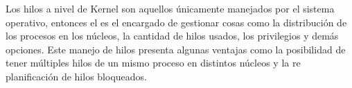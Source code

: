 \documentclass[12pt]{article}
\begin{document}
Los hilos a nivel de Kernel son aquellos únicamente manejados por el sistema operativo, entonces el es el encargado de gestionar cosas como la distribución de los procesos en los núcleos,  la cantidad de hilos usados, los privilegios y demás opciones. Este manejo de hilos presenta algunas ventajas como la posibilidad de tener múltiples hilos de un mismo proceso en distintos núcleos y la re planificación de hilos bloqueados.


\medskip
 
\end{document}
